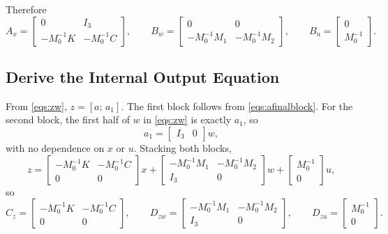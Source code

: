 \documentclass[11pt]{article}
\begin{document}
Therefore
\begin{equation}
    A_x =
    \begin{bmatrix}
        0 & I_3 \\
        -M_0^{-1}K & -M_0^{-1}C
    \end{bmatrix},
    \qquad
    B_w =
    \begin{bmatrix}
        0 & 0 \\
        -M_0^{-1}M_1 & -M_0^{-1}M_2
    \end{bmatrix},
    \qquad
    B_u =
    \begin{bmatrix}
        0 \\
        M_0^{-1}
    \end{bmatrix}.
    \label{eqs:ABmats}
\end{equation}

\subsection{Derive the Internal Output Equation}

From \eqref{eqs:zw}, $z = [a;\, a_1]$. The first block follows from
\eqref{eqs:afinalblock}. For the second block, the first half of $w$ in
\eqref{eqs:zw} is exactly $a_1$, so
\begin{equation}
    a_1 =
    \begin{bmatrix}
        I_3 & 0
    \end{bmatrix}
    w,
    \label{eqs:a1selector}
\end{equation}
with no dependence on $x$ or $u$. Stacking both blocks,
\begin{equation}
    z
    =
    \begin{bmatrix}
        -M_0^{-1}K & -M_0^{-1}C \\
        0 & 0
    \end{bmatrix}
    x
    +
    \begin{bmatrix}
        -M_0^{-1}M_1 & -M_0^{-1}M_2 \\
        I_3 & 0
    \end{bmatrix}
    w
    +
    \begin{bmatrix}
        M_0^{-1} \\
        0
    \end{bmatrix}
    u,
    \label{eqs:loopblocks}
\end{equation}
so
\begin{equation}
    C_z =
    \begin{bmatrix}
        -M_0^{-1}K & -M_0^{-1}C \\
        0 & 0
    \end{bmatrix},
    \qquad
    D_{zw} =
    \begin{bmatrix}
        -M_0^{-1}M_1 & -M_0^{-1}M_2 \\
        I_3 & 0
    \end{bmatrix},
    \qquad
    D_{zu} =
    \begin{bmatrix}
        M_0^{-1} \\
        0
    \end{bmatrix}.
    \label{eqs:CDloop}
\end{equation}
\end{document}
